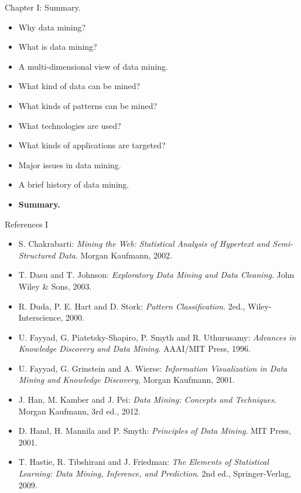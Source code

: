 \documentclass[aspectratio=169,t]{beamer}
\begin{document}
 { 
    \begin{frame}{Chapter I: Summary.}
        \begin{itemize}
            \item Why data mining?
            \item What is data mining?
            \item A multi-dimensional view of data mining.
            \item What kind of data can be mined?
            \item What kinds of patterns can be mined?
            \item What technologies are used?
            \item What kinds of applications are targeted?
            \item Major issues in data mining.
            \item A brief history of data mining.
            \item \textbf{Summary.}
        \end{itemize}
    \end{frame}
  }

  { 
    \begin{frame}{References I}
        \begin{itemize}
          \item S. Chakrabarti: \emph{Mining the Web: Statistical Analysis of Hypertext and Semi-Structured Data}. Morgan Kaufmann, 2002.
          \item T. Dasu and T. Johnson: \emph{Exploratory Data Mining and Data Cleaning}. John Wiley \& Sons, 2003.
          \item R. Duda, P. E. Hart and D. Stork: \emph{Pattern Classification}. 2ed., Wiley-Interscience, 2000.
          \item U. Fayyad, G. Piatetsky-Shapiro, P. Smyth and R. Uthurusamy: \emph{Advances in Knowledge Discovery and Data Mining}. AAAI/MIT Press, 1996.
          \item U. Fayyad, G. Grinstein and A. Wierse: \emph{Information Visualization in Data Mining and Knowledge Discovery}, Morgan Kaufmann, 2001.
          \item J. Han, M. Kamber and J. Pei: \emph{Data Mining: Concepts and Techniques}. Morgan Kaufmann, 3rd ed., 2012.
          \item D. Hand, H. Mannila and P. Smyth: \emph{Principles of Data Mining}. MIT Press, 2001.
          \item T. Hastie, R. Tibshirani and J. Friedman: \emph{The Elements of Statistical Learning: Data Mining, Inference, and Prediction}. 2nd ed., Springer-Verlag, 2009.
        \end{itemize}
    \end{frame}
  }
\end{document}
